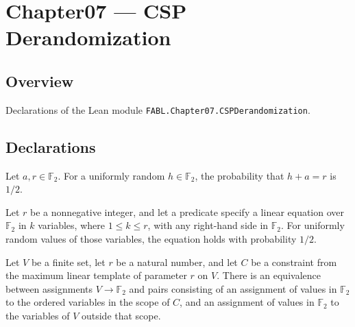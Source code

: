 \chapter{Chapter07 — CSP Derandomization}
\section{Overview}

Declarations of the Lean module \texttt{FABL.Chapter07.CSPDerandomization}.

\section{Declarations}

\begin{theorem}
\leanok
{}
Let $a,r\in\mathbb F_2$. For a uniformly random $h\in\mathbb F_2$, the probability
that $h+a=r$ is $1/2$.
\end{theorem}

\begin{theorem}
\label{FABL.expect_maxLinearPredicate}
\leanok
{}
Let $r$ be a nonnegative integer, and let a predicate specify a linear equation over
$\mathbb F_2$ in $k$ variables, where $1\le k\le r$, with any right-hand side in
$\mathbb F_2$. For uniformly random values of those variables, the equation holds with
probability $1/2$.
\end{theorem}

\begin{definition}
\label{FABL.maxLinearScopeSplitEquiv}
\leanok
{}
Let $V$ be a finite set, let $r$ be a natural number, and let $C$ be a constraint from
the maximum linear template of parameter $r$ on $V$. There is an equivalence between
assignments $V \to \mathbb{F}_2$ and pairs consisting of an assignment of values in
$\mathbb{F}_2$ to the ordered variables in the scope of $C$, and an assignment of values
in $\mathbb{F}_2$ to the variables of $V$ outside that scope.
\end{definition}

